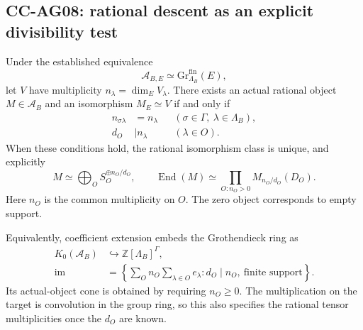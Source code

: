 \subsection{CC-AG08: rational descent as an explicit divisibility test}

Under the established equivalence
\[
       \mathcal A_{B,E}\simeq
                    \mathrm{Gr}^{\mathrm{fin}}_{\Lambda_B}(E),
                                                               \tag{CC-AG.28}
\]
let \(V\) have multiplicity
\(n_\lambda=\dim_E V_\lambda\).
There exists an actual rational object \(M\in\mathcal A_B\)
and an isomorphism \(M_E\simeq V\) if and only if
\[
 \begin{aligned}
 n_{\sigma\lambda}&=n_\lambda
                 &&(\sigma\in\Gamma,\ \lambda\in\Lambda_B),\\
 d_O&\mid n_\lambda
                 &&(\lambda\in O).
 \end{aligned}                                                \tag{CC-AG.29}
\]
When these conditions hold, the rational isomorphism class is
unique, and explicitly
\[
       M\simeq\bigoplus_O S_O^{\oplus n_O/d_O},\qquad
       \operatorname{End}(M)
          \simeq\prod_{O:n_O>0}M_{n_O/d_O}(D_O).               \tag{CC-AG.30}
\]
Here \(n_O\) is the common multiplicity on \(O\).
The zero object corresponds to empty support.

Equivalently, coefficient extension embeds the Grothendieck
ring as
\[
 \begin{split}
 K_0(\mathcal A_B)&\hookrightarrow
                         \mathbb Z[\Lambda_B]^\Gamma,\\
 \operatorname{im}&=
     \left\{\sum_O n_O\!\sum_{\lambda\in O}e_\lambda:
                   d_O\mid n_O,\ \text{finite support}\right\}.
 \end{split}                                                \tag{CC-AG.31}
\]
Its actual-object cone is obtained by requiring \(n_O\ge0\).
The multiplication on the target is convolution in the
group ring, so this also specifies the rational tensor
multiplicities once the \(d_O\) are known.

